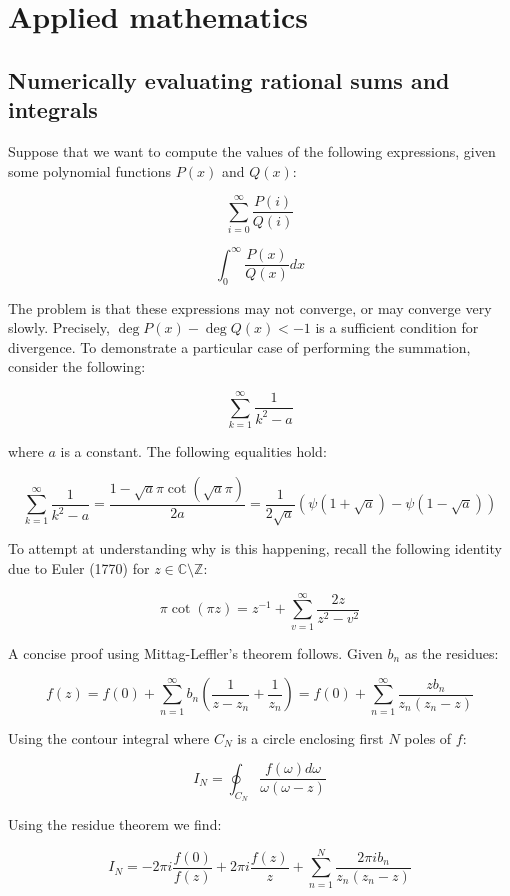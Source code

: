 
\chapter{Applied mathematics}

\section{Numerically evaluating rational sums and integrals}

Suppose that we want to compute the values of the following expressions, given some polynomial functions $P(x)$ and $Q(x)$:

$$
\sum_{i=0}^\infty \frac{P(i)}{Q(i)}
$$

$$
\int_0^\infty \frac{P(x)}{Q(x)} dx
$$

\noindent The problem is that these expressions may not converge, or may converge very slowly. Precisely, $\deg P(x) - \deg Q(x) < -1$ is a sufficient condition for divergence. To demonstrate a particular case of performing the summation, consider the following:

$$\sum_{k=1}^\infty \frac{1}{k^2 - a}$$

\noindent where $a$ is a constant. The following equalities hold:

$$\sum_{k=1}^\infty \frac{1}{k^2 - a} = \frac{1-\sqrt{a}\pi\cot(\sqrt{a}\pi)}{2a} = \frac{1}{2\sqrt{a}}\left(\psi\left(1+\sqrt{a}\right)-\psi\left(1-\sqrt{a}\right)\right)$$

\noindent To attempt at understanding why is this happening, recall the following identity due to Euler (1770) for $z \in \mathbb{C} \setminus \mathbb{Z}$:

$$
\pi \cot(\pi z) = z^{-1} + \sum_{v=1}^\infty \frac{2z}{z^2 - v^2}
$$

\noindent A concise proof using Mittag-Leffler's theorem follows. Given $b_n$ as the residues:

$$
f(z) = f(0) + \sum_{n=1}^\infty b_n \left(\frac{1}{z-z_n} + \frac{1}{z_n}\right) = f(0) + \sum_{n=1}^\infty \frac{zb_n}{z_n(z_n-z)}
$$

\noindent Using the contour integral where $C_N$ is a circle enclosing first $N$ poles of $f$:

$$
I_N = \oint_{C_N} \frac{f(\omega)d\omega}{\omega(\omega - z)}
$$

\noindent Using the residue theorem we find:

$$
I_N = -2\pi i \frac{f(0)}{f(z)} + 2\pi i \frac{f(z)}{z} + \sum_{n=1}^N \frac{2\pi i b_n}{z_n(z_n - z)}
$$

